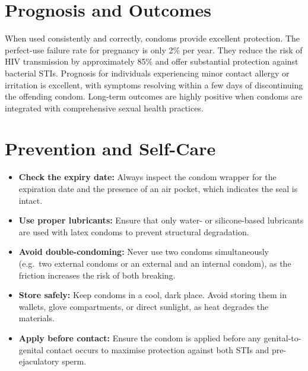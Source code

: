 \section*{Prognosis and Outcomes}
When used consistently and correctly, condoms provide excellent protection. The perfect-use failure rate for pregnancy is only 2\% per year. They reduce the risk of HIV transmission by approximately 85\% and offer substantial protection against bacterial STIs. Prognosis for individuals experiencing minor contact allergy or irritation is excellent, with symptoms resolving within a few days of discontinuing the offending condom. Long-term outcomes are highly positive when condoms are integrated with comprehensive sexual health practices.

\section*{Prevention and Self-Care}
\begin{itemize}
    \item \textbf{Check the expiry date:} Always inspect the condom wrapper for the expiration date and the presence of an air pocket, which indicates the seal is intact.
    \item \textbf{Use proper lubricants:} Ensure that only water- or silicone-based lubricants are used with latex condoms to prevent structural degradation.
    \item \textbf{Avoid double-condoming:} Never use two condoms simultaneously (e.g.\ two external condoms or an external and an internal condom), as the friction increases the risk of both breaking.
    \item \textbf{Store safely:} Keep condoms in a cool, dark place. Avoid storing them in wallets, glove compartments, or direct sunlight, as heat degrades the materials.
    \item \textbf{Apply before contact:} Ensure the condom is applied before any genital-to-genital contact occurs to maximise protection against both STIs and pre-ejaculatory sperm.
\end{itemize}

